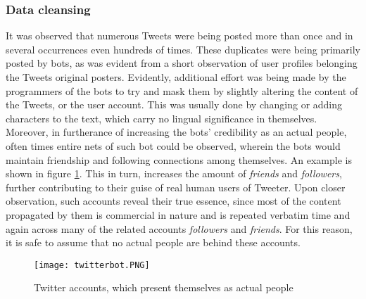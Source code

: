 		\subsubsection*{Data cleansing}
			It was observed that numerous Tweets were being posted more than once and in several occurrences even hundreds of times. These duplicates were being primarily posted by bots, as was evident from a short observation of user profiles belonging the Tweets original posters. Evidently, additional effort was being made by the programmers of the bots to try and mask them by slightly altering the content of the Tweets, or the user account. This was usually done by changing or adding characters to the text, which carry no lingual significance in themselves. Moreover, in furtherance of increasing the bots' credibility as an actual people, often times entire nets of such bot could be observed, wherein the bots would maintain friendship and following connections among themselves. An example is shown in figure \ref{fig:twitterbot}. This in turn, increases the amount of \textit{friends} and \textit{followers}, further contributing to their guise of real human users of Tweeter. Upon closer observation, such accounts reveal their true essence, since most of the content propagated by them is commercial in nature and is repeated verbatim time and again across many of the related accounts \textit{followers} and \textit{friends}. For this reason, it is safe to assume that no actual people are behind these accounts. 
		\par
		
		\begin{figure}[h]
			\centering
			\texttt{[image: twitterbot.PNG]}
			\captionsetup{width=0.8\textwidth}
			\caption[Fake Twitter Accounts]{Twitter accounts, which present themselves as actual people}
			\label{fig:twitterbot}	
		\end{figure}
		
